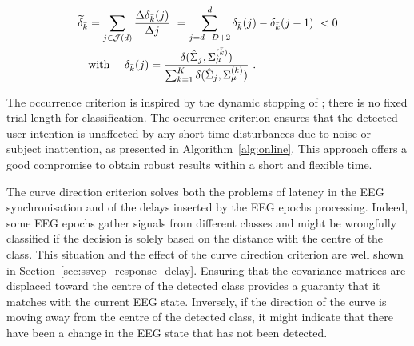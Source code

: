 \begin{equation}
\label{eq:dist_vec}
\begin{split}
  \disvec_{\cloutmp} &= \sum_{\tj \in \Dindex(\di)} \frac{\Delta \diffdist_{\cloutmp}(\tj)}{\Delta \tj} 
  \ = \sum_{\tj=\di-\dd+2}^{\di} \diffdist_{\cloutmp}(\tj) - \diffdist_{\cloutmp}(\tj-1)
	\ < 0 
	\\
  & \text{with} \ \ \ \ \diffdist_{\cloutmp}(\tj) = \frac{\distR (\cov{\textit{\tj}}, \P_{\Rm}^{(\cloutmp)} )}{\sum_{\ci=1}^{\dK} \distR (\cov{\textit{\tj}},\P_{\Rm}^{(\ci)})} \ .
\end{split}
\end{equation}

The occurrence criterion is inspired by the dynamic stopping of \citep{verschore_dynamic_2012}; there is no fixed trial length for classification.
The occurrence criterion ensures that the detected user intention is unaffected by any short time disturbances due to noise or subject inattention, as presented in Algorithm~\ref{alg:online}. 
This approach offers a good compromise to obtain robust results within a short and flexible time.

The curve direction criterion solves both the problems of latency in the EEG synchronisation and of the delays inserted by the EEG epochs processing. 
Indeed, some EEG epochs gather signals from different classes and might be wrongfully classified if the decision is solely based on the distance with the centre of the class.
This situation and the effect of the curve direction criterion are well shown in Section~\ref{sec:ssvep_response_delay}. 
Ensuring that the covariance matrices are displaced toward the centre of the detected class provides a guaranty that it matches with the current EEG state.
Inversely, if the direction of the curve is moving away from the centre of the detected class, it might indicate that there have been a change in the EEG state that has not been detected.


